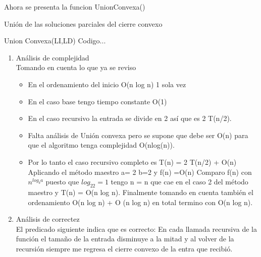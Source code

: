 \documentclass[9pt,spanish]{article}
\numberwithin{equation}{section}
\begin{document}
Ahora se presenta la funcion UnionConvexa()
\begin{algorithm}[H]
	\caption{Unión de las soluciones parciales del cierre convexo}
	\begin{algorithmic}[1]
	\State Union Convexa(LI,LD)
	\State  Codigo...
	\end{algorithmic}
\end{algorithm}
\begin{enumerate}
\item Análisis de complejidad\\
Tomando en cuenta lo que ya se reviso
\begin{itemize}
\item En el ordenamiento del inicio O(n log n) 1 sola vez
\item En el caso base tengo tiempo constante O(1)
\item En el caso recursivo la entrada se divide en 2 así que es 2 T(n/2).
\item Falta análisis de Unión convexa pero se supone que debe ser   O(n) para que el algoritmo tenga complejidad O(nlog(n)).
\item Por lo tanto el caso recursivo completo es T(n) = 2 T(n/2) + O(n)
Aplicando el método maestro a= 2 b=2 y f(n) =O(n)
Comparo f(n) con $n^{log_ba}$ puesto que $log_22 = 1$ tengo n = n que cae en el caso 2 del método maestro y T(n) = O(n log n). Finalmente tomando en cuenta también el ordenamiento O(n log n) + O (n log n) en total termino con O(n log n).
\end{itemize}
\item Análisis de correctez \\
El predicado siguiente indica que es correcto:
En cada llamada recursiva de la función el tamaño de la entrada disminuye a la mitad y al volver de la recursión siempre me regresa el cierre convexo de la entra que recibió.

\end{enumerate}

\newpage
\end{document}
